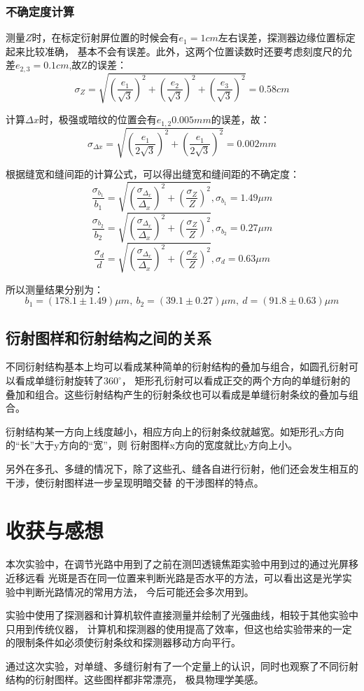 \documentclass{article}
\newcommand{\degree}{^\circ}
\begin{document}
    \subsubsection{不确定度计算}
    测量$Z$时，在标定衍射屏位置的时候会有$e_1=1cm$左右误差，探测器边缘位置标定起来比较准确，
    基本不会有误差。此外，这两个位置读数时还要考虑刻度尺的允差$e_{2,3}=0.1cm$,故Z的误差：
    $$\sigma_Z=\sqrt{(\frac{e_1}{\sqrt{3}})^2+(\frac{e_2}{\sqrt{3}})^2+(\frac{e_3}{\sqrt{3}})^2}=0.58cm$$

    计算$\Delta x$时，极强或暗纹的位置会有$e_{1,2}0.005mm$的误差，故：
    $$\sigma_{\Delta x}=\sqrt{(\frac{e_1}{2\sqrt{3}})^2+(\frac{e_1}{2\sqrt{3}})^2}=0.002mm$$

    根据缝宽和缝间距的计算公式，可以得出缝宽和缝间距的不确定度：
    $$\frac{\sigma_{b_1}}{b_1}=\sqrt{(\frac{\sigma_{\Delta_x}}{\Delta_x})^2+(\frac{\sigma_Z}{Z})^2},\sigma_{b_1}=1.49\mu m$$
    $$\frac{\sigma_{b_2}}{b_2}=\sqrt{(\frac{\sigma_{\Delta_x}}{\Delta_x})^2+(\frac{\sigma_Z}{Z})^2},\sigma_{b_2}=0.27\mu m$$
    $$\frac{\sigma_{d}}{d}=\sqrt{(\frac{\sigma_{\Delta_x}}{\Delta_x})^2+(\frac{\sigma_Z}{Z})^2},\sigma_{d}=0.63\mu m$$
    
    所以测量结果分别为：
    $$b_1=(178.1\pm1.49)\mu m ,\ b_2=(39.1\pm0.27)\mu m ,\ d = (91.8\pm0.63)\mu m$$

    \subsection{衍射图样和衍射结构之间的关系}
    不同衍射结构基本上均可以看成某种简单的衍射结构的叠加与组合，如圆孔衍射可以看成单缝衍射旋转了$360\degree$，
    矩形孔衍射可以看成正交的两个方向的单缝衍射的叠加和组合。这些衍射结构产生的衍射条纹也可以看成是单缝衍射条纹的叠加与组合。

    衍射结构某一方向上线度越小，相应方向上的衍射条纹就越宽。如矩形孔x方向的“长”大于y方向的“宽”，则
    衍射图样x方向的宽度就比y方向上小。

    另外在多孔、多缝的情况下，除了这些孔、缝各自进行衍射，他们还会发生相互的干涉，使衍射图样进一步呈现明暗交替
    的干涉图样的特点。

    \section{收获与感想}
    本次实验中，在调节光路中用到了之前在测凹透镜焦距实验中用到过的通过光屏移近移远看
    光斑是否在同一位置来判断光路是否水平的方法，可以看出这是光学实验中判断光路情况的常用方法，
    今后可能还会多次用到。

    实验中使用了探测器和计算机软件直接测量并绘制了光强曲线，相较于其他实验中只用到传统仪器，
    计算机和探测器的使用提高了效率，但这也给实验带来的一定的限制条件如必须使衍射条纹和探测器移动方向平行。

    通过这次实验，对单缝、多缝衍射有了一个定量上的认识，同时也观察了不同衍射结构的衍射图样。这些图样都非常漂亮，
    极具物理学美感。
    
\end{document}
